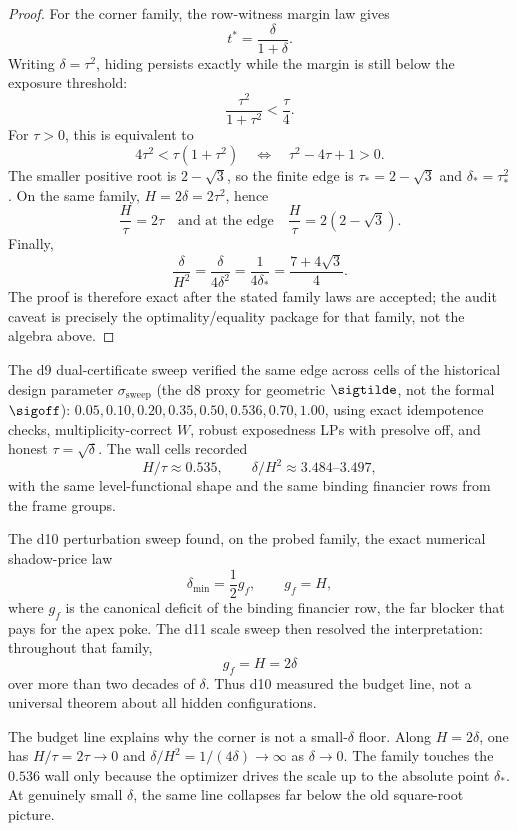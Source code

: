 \begin{proof}
For the corner family, the row-witness margin law gives
\[
  t^*=\frac{\delta}{1+\delta}.
\]
Writing \(\delta=\tau^2\), hiding persists exactly while the margin is still
below the exposure threshold:
\[
  \frac{\tau^2}{1+\tau^2}<\frac{\tau}{4}.
\]
For \(\tau>0\), this is equivalent to
\[
  4\tau^2<\tau(1+\tau^2)
  \quad\Longleftrightarrow\quad
  \tau^2-4\tau+1>0.
\]
The smaller positive root is \(2-\sqrt 3\), so the finite edge is
\(\tau_* = 2-\sqrt 3\) and \(\delta_*=\tau_*^2\).  On the same family,
\(H=2\delta=2\tau^2\), hence
\[
  \frac{H}{\tau}=2\tau
  \quad\text{and at the edge}\quad
  \frac{H}{\tau}=2(2-\sqrt 3).
\]
Finally,
\[
  \frac{\delta}{H^2}
    =\frac{\delta}{4\delta^2}
    =\frac{1}{4\delta_*}
    =\frac{7+4\sqrt 3}{4}.
\]
The proof is therefore exact after the stated family laws are accepted; the
audit caveat is precisely the optimality/equality package for that family, not
the algebra above.
\end{proof}

\begin{numericalresult}
\numbadge
The d9 dual-certificate sweep verified the same edge across cells of the
historical design parameter \(\sigma_{\mathrm{sweep}}\) (the d8 proxy for
geometric \(\sigtilde\), not the formal \(\sigoff\)):
\(0.05,0.10,0.20,0.35,0.50,0.536,0.70,1.00\), using exact idempotence
checks, multiplicity-correct \(W\), robust exposedness LPs with presolve off,
and honest \(\tau=\sqrt\delta\).  The wall cells recorded
\[
  H/\tau \approx 0.535,\qquad \delta/H^2\approx 3.484\text{--}3.497,
\]
with the same level-functional shape and the same binding financier rows from
the frame groups.

The d10 perturbation sweep found, on the probed family, the exact numerical
shadow-price law
\[
  \delta_{\min}=\frac12 g_f,\qquad g_f=H,
\]
where \(g_f\) is the canonical deficit of the binding financier row, the far
blocker that pays for the apex poke.  The d11 scale sweep then resolved the
interpretation: throughout that family,
\[
  g_f=H=2\delta
\]
over more than two decades of \(\delta\).  Thus d10 measured the budget line,
not a universal theorem about all hidden configurations.
\end{numericalresult}

The budget line explains why the corner is not a small-\(\delta\) floor.  Along
\(H=2\delta\), one has \(H/\tau=2\tau\to0\) and
\(\delta/H^2=1/(4\delta)\to\infty\) as \(\delta\to0\).
The family touches the \(0.536\) wall only because the optimizer drives the
scale up to the absolute point \(\delta_*\).  At genuinely small \(\delta\), the
same line collapses far below the old square-root picture.

